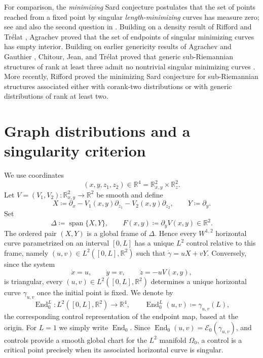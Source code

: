 \documentclass[11pt]{amsart}
\numberwithin{equation}{section}
\theoremstyle{remark}
\newcommand{\R}{\mathbb R}
\newcommand{\Span}{\operatorname{span}}
\newcommand{\End}{\operatorname{End}}
\begin{document}
For comparison, the \emph{minimizing} Sard conjecture postulates that the set of
points reached from a fixed point by singular \emph{length-minimizing} curves has
measure zero; see \cite[Conjecture~1]{RiffordTrelat} and also the second
question in \cite[Problem~III]{AgrachevOpen}.  Building on a density result of Rifford and Tr\'elat
\cite{RiffordTrelat}, Agrachev
\cite{AgrachevSmooth} proved that the set of endpoints of singular minimizing curves has
empty interior.
Building on earlier genericity results of Agrachev and Gauthier \cite{AGauthier}, Chitour, Jean, and Tr\'elat proved that generic sub-Riemannian structures of rank at least three admit no nontrivial singular minimizing curves \cite{CJT}.  More recently, Rifford
\cite{RiffordMinSard} proved the minimizing Sard conjecture for
 sub-Riemannian structures associated either with corank-two
distributions or with generic distributions of rank at least two.


\section{Graph distributions and a singularity criterion}

We use coordinates
\begin{equation}
 (x,y,z_1,z_2)\in\R^4=\R^2_{x,y}\times\R^2_z.
\end{equation}
Let $V=(V_1,V_2):\R^2_{x,y}\to\R^2$ be smooth and define
\begin{equation}\label{eq:fields}
 X\coloneq \partial_x-V_1(x,y)\partial_{z_1}
                  -V_2(x,y)\partial_{z_2},
 \qquad
 Y\coloneq \partial_y.
\end{equation}
Set
\begin{equation}
 \Delta\coloneq \Span\{X,Y\},
 \qquad
 F(x,y)\coloneq \partial_yV(x,y)\in\R^2.
\end{equation}
The ordered pair $(X,Y)$ is a global frame of $\Delta$.  Hence every
$W^{1,2}$ horizontal curve parametrized on an interval $[0,L]$ has a unique $L^2$ control relative to this
frame, namely $(u,v)\in L^2([0,L],\R^2)$ such that $\dot\gamma = u X + v Y$. Conversely, since the system
\begin{equation}\label{eq:triangular-system}
 \dot x=u,
 \qquad
 \dot y=v,
 \qquad
 \dot z=-uV(x,y),
\end{equation}
is triangular, every $(u,v)\in L^2([0,L],\R^2)$ determines a unique
horizontal curve $\gamma_{u,v}$ once the initial point is fixed.  We denote by
\begin{equation}
 \End_0^L:L^2([0,L],\R^2)\longrightarrow\R^4,
 \qquad
 \End_0^L(u,v)\coloneq \gamma_{u,v}(L),
\end{equation}
the corresponding control representation of the endpoint map, based at the origin.  For $L=1$ we simply write $\End_0$. Since $\End_0(u,v)=\mathcal E_0(\gamma_{u,v})$, and controls provide a smooth global chart for the $L^2$ manifold $\Omega_0$, a control is a critical point precisely when its associated horizontal curve is singular. 
\end{document}
